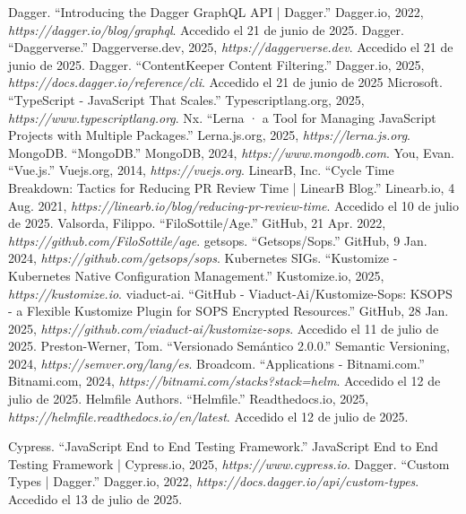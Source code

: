 \begin{thebibliography}{99}
 Dagger. ``Introducing the Dagger GraphQL API | Dagger.'' Dagger.io, 2022, {\it https://dagger.io/blog/graphql}. Accedido el 21 de junio de 2025.
 Dagger. ``Daggerverse.'' Daggerverse.dev, 2025, {\it https://daggerverse.dev}. Accedido el 21 de junio de 2025.
 Dagger. ``ContentKeeper Content Filtering.'' Dagger.io, 2025, {\it https://docs.dagger.io/reference/cli}. Accedido el 21 de junio de 2025
 Microsoft. ``TypeScript - JavaScript That Scales.'' Typescriptlang.org, 2025, {\it https://www.typescriptlang.org}.
 Nx. ``Lerna · a Tool for Managing JavaScript Projects with Multiple Packages.'' Lerna.js.org, 2025, {\it https://lerna.js.org}.
 MongoDB. ``MongoDB.'' MongoDB, 2024, {\it https://www.mongodb.com}.
 You, Evan. ``Vue.js.'' Vuejs.org, 2014, {\it https://vuejs.org}.
 LinearB, Inc. ``Cycle Time Breakdown: Tactics for Reducing PR Review Time | LinearB Blog.'' Linearb.io, 4 Aug. 2021, {\it https://linearb.io/blog/reducing-pr-review-time}. Accedido el 10 de julio de 2025.
 Valsorda, Filippo. ``FiloSottile/Age.'' GitHub, 21 Apr. 2022, {\it https://github.com/FiloSottile/age}.
 getsops. ``Getsops/Sops.'' GitHub, 9 Jan. 2024, {\it https://github.com/getsops/sops}.
 Kubernetes SIGs. ``Kustomize - Kubernetes Native Configuration Management.'' Kustomize.io, 2025, {\it https://kustomize.io}.
 viaduct-ai. ``GitHub - Viaduct-Ai/Kustomize-Sops: KSOPS - a Flexible Kustomize Plugin for SOPS Encrypted Resources.'' GitHub, 28 Jan. 2025, {\it https://github.com/viaduct-ai/kustomize-sops}. Accedido el 11 de julio de 2025.
 Preston-Werner, Tom. ``Versionado Semántico 2.0.0.'' Semantic Versioning, 2024, {\it https://semver.org/lang/es}.
 Broadcom. ``Applications - Bitnami.com.'' Bitnami.com, 2024, {\it https://bitnami.com/stacks?stack=helm}. Accedido el 12 de julio de 2025.
 Helmfile Authors. ``Helmfile.'' Readthedocs.io, 2025, {\it https://helmfile.readthedocs.io/en/latest}. Accedido el 12 de julio de 2025.

 Cypress. ``JavaScript End to End Testing Framework.'' JavaScript End to End Testing Framework | Cypress.io, 2025, {\it https://www.cypress.io}.
 Dagger. ``Custom Types | Dagger.'' Dagger.io, 2022, {\it https://docs.dagger.io/api/custom-types}. Accedido el 13 de julio de 2025.
\end{thebibliography}

